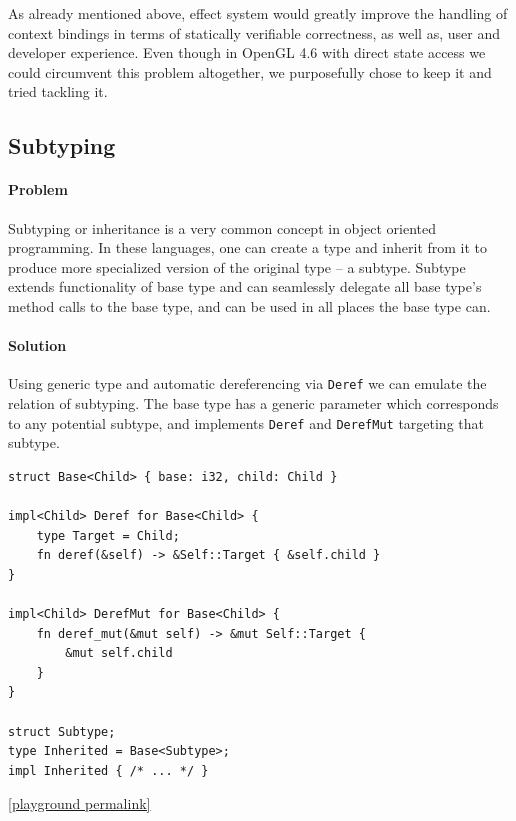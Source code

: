 As already mentioned above, effect system would greatly improve the handling of context bindings in terms of statically verifiable correctness, as well as, user and developer experience.
Even though in OpenGL 4.6 with direct state access we could circumvent this problem altogether, we purposefully chose to keep it and tried tackling it.

\subsection{Subtyping}

\paragraph{Problem}

Subtyping or inheritance is a very common concept in object oriented programming. 
In these languages, one can create a type and inherit from it to produce more specialized version of the original type -- a subtype.
Subtype extends functionality of base type and can seamlessly delegate all base type's method calls to the base type, and can be used in all places the base type can.

\paragraph{Solution}

Using generic type and automatic dereferencing via \texttt{Deref} we can emulate the relation of subtyping.
The base type has a generic parameter which corresponds to any potential subtype, and implements \texttt{Deref} and \texttt{DerefMut} targeting that subtype.

\begin{lstlisting}
struct Base<Child> { base: i32, child: Child }

impl<Child> Deref for Base<Child> {
    type Target = Child;
    fn deref(&self) -> &Self::Target { &self.child }
}

impl<Child> DerefMut for Base<Child> {
    fn deref_mut(&mut self) -> &mut Self::Target {
        &mut self.child
    }
}

struct Subtype;
type Inherited = Base<Subtype>;
impl Inherited { /* ... */ }
\end{lstlisting}

\noindent \href{https://play.rust-lang.org/?version=stable&mode=debug&edition=2021&gist=8946828515f1f87f388374b6bbc69bca}{[playground permalink]}

